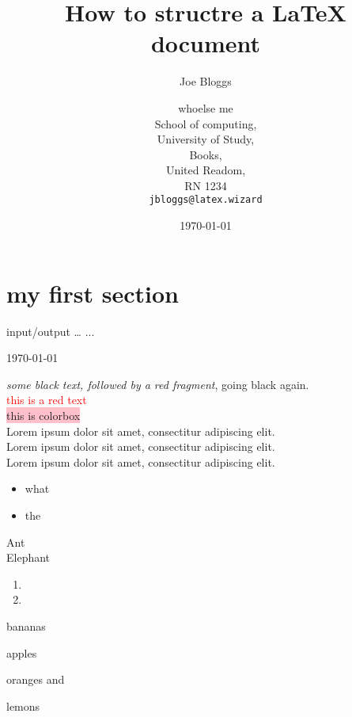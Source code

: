\documentclass{article}
\title{How to structre a \LaTeX{} document}
\author{Joe Bloggs \and whoelse me \\
        School of computing, \\
        University of Study, \\
        Books, \\
        United Readom, \\
        RN 1234\\
        \texttt{jbloggs@latex.wizard}}
\date{\today}
\begin{document}
\maketitle
\vfill
\tableofcontents
\clearpage
\section{my first section}

input\slash output
\ldots
...

\today

\emph{some black text, \color{red} followed by a red fragment}, going black again. \\
\textcolor{red} {this is a red text} \\
\colorbox{pink}{this is colorbox} \\

Lorem ipsum dolor sit amet, consectitur adipiscing elit. \\
\renewcommand*\rmdefault{pag}
Lorem ipsum dolor sit amet, consectitur adipiscing elit. \\
\renewcommand*\rmdefault{iwona}
Lorem ipsum dolor sit amet, consectitur adipiscing elit. \\

\begin{itemize}
   \item what
   \item the
\end{itemize}
\begin{description}
    \item [Ant] \blindtext
    \item [Elephant] \blindtext
\end{description}
\begin{enumerate}
   \item \blindtext
   \item \blindtext
\end{enumerate}

\noindent
\begin{enumerate*}[label={\alph*) }, font={\color{green}\bfseries}]
\item bananas \\
\item apples \\
\item oranges and \\
\item lemons \\
\end{enumerate*}
\end{document}

